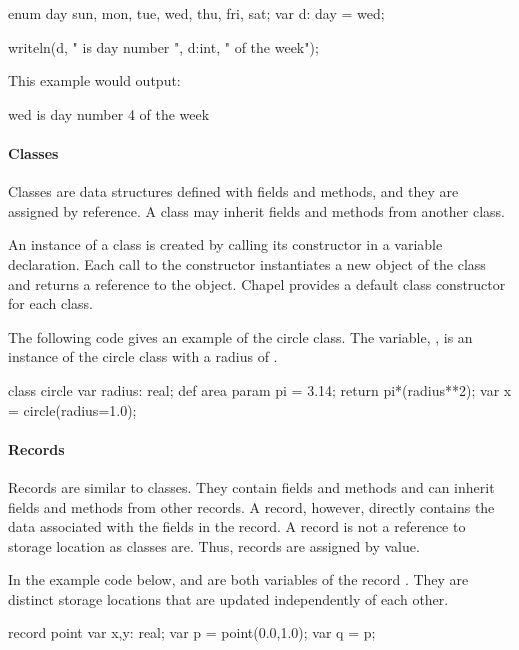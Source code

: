 \begin{example}
\begin{chapel}
enum day {sun, mon, tue, wed, thu, fri, sat};
var d: day = wed;

writeln(d, " is day number ", d:int, " of the week");
\end{chapel}

This example would output:
\begin{commandline}
wed is day number 4 of the week
\end{commandline}
\end{example}

\paragraph{Classes}
Classes are data structures defined with fields and methods, and
they are assigned by reference.  A class may inherit fields and
methods from another class.  

An instance of a class is created by calling its constructor
in a variable declaration.  Each call to the constructor
instantiates a new object of the class and returns a reference to 
the object.  Chapel provides a default class constructor for each class.

\begin{example}
The following code gives an example of the circle class.  
The variable, , is an instance of the circle class with
a radius of .
\begin{chapel}
class circle {
  var radius: real;
  def area {
    param pi = 3.14;
    return pi*(radius**2);
  }
}
var x = circle(radius=1.0);
\end{chapel}
\end{example}

\paragraph{Records}
Records are similar to classes.  They contain fields and methods
and can inherit fields and methods from other records.  A record,
however, directly contains the data associated with the fields
in the record.  A record is not a reference to storage location as
classes are.  Thus, records are assigned by value.  

\begin{example}
In the example code below,  and  are both
variables of the record .  They are distinct storage
locations that are updated independently of each other.

\begin{chapel}
record point {
  var x,y: real;
}
var p = point(0.0,1.0);
var q = p;
\end{chapel}
\end{example}

